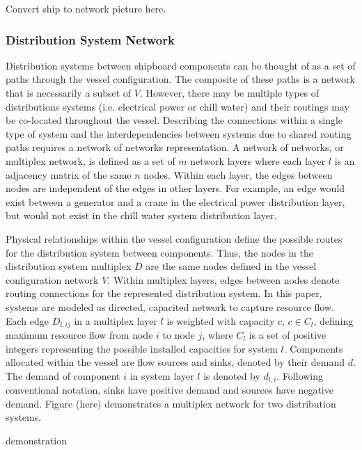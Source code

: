 \documentclass[preprint,12pt]{elsarticle}
\begin{document}
Convert ship to network picture here.

 

\subsubsection{Distribution System Network} \label{sec:sysmodel}
Distribution systems between shipboard components can be thought of as a set of paths through the vessel configuration. The composite of these paths is a network that is necessarily a subset of $V$. However, there may be multiple types of distributions systems (i.e. electrical power or chill water) and their routings may be co-located throughout the vessel. Describing the connections within a single type of system and the interdependencies between systems due to shared routing paths requires a network of networks representation. A network of networks, or multiplex network, is defined as a set of $m$ network layers where each layer $l$ is an adjacency matrix of the same $n$ nodes. Within each layer, the edges between nodes are independent of the edges in other layers. For example, an edge would exist between a generator and a crane in the electrical power distribution layer, but would not exist in the chill water system distribution layer. 

Physical relationships within the vessel configuration define the possible routes for the distribution system between components. Thus, the nodes in the distribution system multiplex $D$ are the same nodes defined in the vessel configuration network $V$. Within multiplex layers, edges between nodes denote routing connections for the represented distribution system. In this paper, systems are modeled as directed, capacited network to capture resource flow. Each edge $D_{l,ij}$ in a multiplex layer $l$ is weighted with capacity $c$, $c \in C_l$, defining maximum resource flow from node $i$ to node $j$, where $C_l$ is a set of positive integers representing the possible installed capacities for system $l$. Components allocated within the vessel are flow sources and sinks, denoted by their demand $d$. The demand of component $i$ in system layer $l$ is denoted by $d_{l,i}$. Following conventional notation, sinks have positive demand and sources have negative demand. Figure (here) demonstrates a multiplex network for two distribution systems.

demonstration
\end{document}
